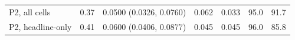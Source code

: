 \begin{tabular}{lrrrrrr}
P2, all cells & 0.37 & 0.0500 (0.0326, 0.0760) & 0.062 & 0.033 & 95.0 & 91.7 \\
P2, headline-only & 0.41 & 0.0600 (0.0406, 0.0877) & 0.045 & 0.045 & 96.0 & 85.8 \\

\end{tabular}
